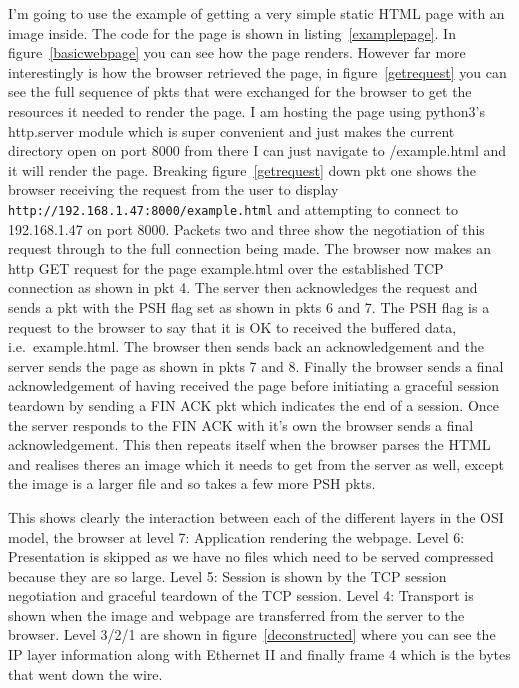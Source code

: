 \documentclass[titlepage]{article}
\begin{document}
I'm going to use the example of getting a very
simple static HTML page with an image inside. The code for the page is shown in
listing~\ref{examplepage}. In figure~\ref{basicwebpage} you can see how the page renders.
However far more interestingly is how the browser retrieved the page, in figure~\ref{getrequest}
you can see the full sequence of \glspl{pkt} that were exchanged for the browser to get the resources
it needed to render the page. I am hosting the page using python3's http.server module
which is super convenient and just makes the current directory open on port 8000
from there I can just navigate to /example.html and it will render the page. Breaking
figure~\ref{getrequest} down \gls{pkt} one shows the browser receiving the request from
the user to display \verb|http://192.168.1.47:8000/example.html| and attempting to connect
to 192.168.1.47 on port 8000. Packets two and three show the negotiation of this request
through to the full connection being made. The browser now makes an \gls{http} GET
request for the page example.html over the established TCP connection as shown in \gls{pkt} 4.
The server then acknowledges the request and sends a \gls{pkt} with the PSH flag set
as shown in \glspl{pkt} 6 and 7. The PSH flag is a request to the browser to say that it is
OK to received the buffered data, i.e.\ example.html. The browser then sends back an
acknowledgement and the server sends the page as shown in \glspl{pkt} 7 and 8. Finally
the browser sends a final acknowledgement of having received the page before initiating
a graceful session teardown by sending a FIN ACK \gls{pkt} which indicates the end of a session.
Once the server responds to the FIN ACK with it's own the browser sends a final acknowledgement.
This then repeats itself when the browser parses the HTML and realises theres an image which
it needs to get from the server as well, except the image is a larger file and so takes a few
more PSH \glspl{pkt}.

This shows clearly the interaction between each of the different layers in the OSI model,
the browser at level 7: Application rendering the webpage. Level 6: Presentation is skipped as
we have no files which need to be served compressed because they are so large. Level 5: Session
is shown by the TCP session negotiation and graceful teardown of the TCP session. Level 4: Transport
is shown when the image and webpage are transferred from the server to the browser. Level 3/2/1
are shown in figure~\ref{deconstructed} where you can see the IP layer information along with
Ethernet II and finally frame 4 which is the bytes that went down the wire.
\end{document}
